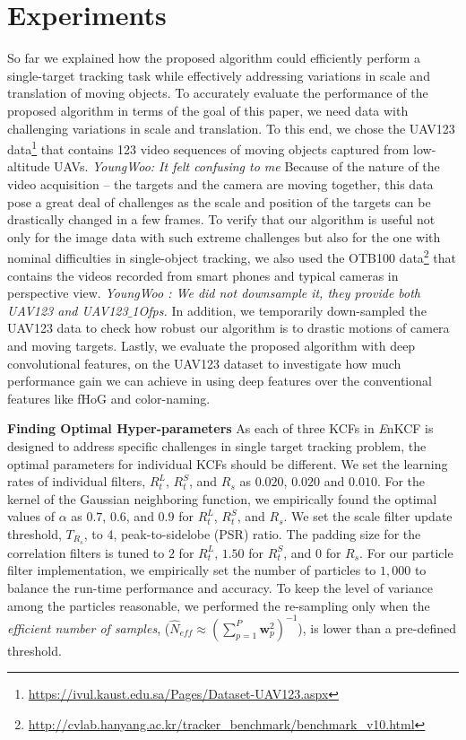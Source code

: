 \documentclass[10pt,twocolumn,letterpaper]{article}
\begin{document}
\section{Experiments} \label{sc:Experiments}
So far we explained how the proposed algorithm could efficiently
perform a single-target tracking task while effectively addressing
variations in scale and translation of moving objects. To accurately
evaluate the performance of the proposed algorithm in terms of the
goal of this paper, we need data with challenging variations in scale
and translation. To this end, we chose the UAV123
data\footnote{\url{https://ivul.kaust.edu.sa/Pages/Dataset-UAV123.aspx}}\cite{mueller2016uav123}
that contains 123 video sequences of moving objects captured from
low-altitude UAVs. \textit{YoungWoo: It felt confusing to me} Because of the nature of the video acquisition --
the targets and the camera are moving together, this data pose a great
deal of challenges as the scale and position of the targets can be
drastically changed in a few frames. To verify that our algorithm is
useful not only for the image data with such extreme challenges but
also for the one with nominal difficulties in single-object tracking,
we also used the OTB100
data\footnote{\url{http://cvlab.hanyang.ac.kr/tracker_benchmark/benchmark_v10.html}}
that contains the videos recorded from smart phones and typical
cameras in perspective view. \textit{YoungWoo : We did not downsample it, they provide both
UAV123 and UAV123$\_$1Ofps.} In addition, we temporarily down-sampled
the UAV123 data to check how robust our algorithm is to drastic
motions of camera and moving targets. Lastly, we evaluate the proposed
algorithm with deep convolutional features, on the UAV123 dataset to
investigate how much performance gain we can achieve in using deep
features over the conventional features like fHoG and color-naming.

\textbf{Finding Optimal Hyper-parameters} As each of three KCFs in
       {\it E}nKCF is designed to address specific challenges in
       single target tracking problem, the optimal parameters for
       individual KCFs should be different. We set the learning rates
       of individual filters, $R_{t}^{L}$, $R_{t}^{S}$, and $R_{s}$ as
       $0.020$, $0.020$ and $0.010$. For the kernel of the Gaussian
       neighboring function, we empirically found the optimal values
       of $\alpha$ as $0.7$, $0.6$, and $0.9$ for $R_{t}^{L}$,
       $R_{t}^{S}$, and $R_{s}$. We set the scale filter update
       threshold, $T_{R_{s}}$, to 4, peak-to-sidelobe (PSR) ratio. The
       padding size for the correlation filters is tuned to $2$ for
       $R_{t}^{L}$, $1.50$ for $R_{t}^{S}$, and $0$ for $R_{s}$. For
       our particle filter implementation, we empirically set the
       number of particles to $1,000$ to balance the run-time
       performance and accuracy. To keep the level of variance among
       the particles reasonable, we performed the re-sampling only
       when the \textit{efficient number of samples}, ($ \hat{N}_{eff}
       \approx (\sum_{p=1}^{P}\mathbf{w}_{p}^{2})^{-1} $), is lower
       than a pre-defined threshold.
\end{document}
